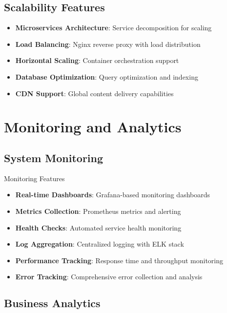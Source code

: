 \documentclass[11pt,a4paper]{article}
\begin{document}
\subsection{Scalability Features}

\begin{itemize}
    \item \textbf{Microservices Architecture}: Service decomposition for scaling
    \item \textbf{Load Balancing}: Nginx reverse proxy with load distribution
    \item \textbf{Horizontal Scaling}: Container orchestration support
    \item \textbf{Database Optimization}: Query optimization and indexing
    \item \textbf{CDN Support}: Global content delivery capabilities
\end{itemize}

\section{Monitoring and Analytics}

\subsection{System Monitoring}

\begin{featurebox}{\faChartLine\space Monitoring Features}
\begin{itemize}
    \item \textbf{Real-time Dashboards}: Grafana-based monitoring dashboards
    \item \textbf{Metrics Collection}: Prometheus metrics and alerting
    \item \textbf{Health Checks}: Automated service health monitoring
    \item \textbf{Log Aggregation}: Centralized logging with ELK stack
    \item \textbf{Performance Tracking}: Response time and throughput monitoring
    \item \textbf{Error Tracking}: Comprehensive error collection and analysis
\end{itemize}
\end{featurebox}

\subsection{Business Analytics}
\end{document}

